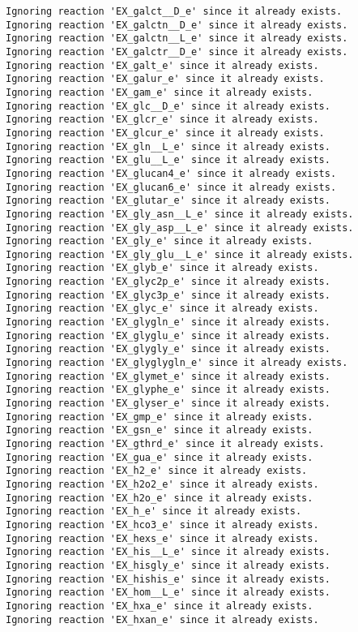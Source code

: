 \documentclass[
  letterpaper,
  DIV=11,
  numbers=noendperiod]{scrartcl}
\begin{document}
\begin{verbatim}
Ignoring reaction 'EX_galct__D_e' since it already exists.
Ignoring reaction 'EX_galctn__D_e' since it already exists.
Ignoring reaction 'EX_galctn__L_e' since it already exists.
Ignoring reaction 'EX_galctr__D_e' since it already exists.
Ignoring reaction 'EX_galt_e' since it already exists.
Ignoring reaction 'EX_galur_e' since it already exists.
Ignoring reaction 'EX_gam_e' since it already exists.
Ignoring reaction 'EX_glc__D_e' since it already exists.
Ignoring reaction 'EX_glcr_e' since it already exists.
Ignoring reaction 'EX_glcur_e' since it already exists.
Ignoring reaction 'EX_gln__L_e' since it already exists.
Ignoring reaction 'EX_glu__L_e' since it already exists.
Ignoring reaction 'EX_glucan4_e' since it already exists.
Ignoring reaction 'EX_glucan6_e' since it already exists.
Ignoring reaction 'EX_glutar_e' since it already exists.
Ignoring reaction 'EX_gly_asn__L_e' since it already exists.
Ignoring reaction 'EX_gly_asp__L_e' since it already exists.
Ignoring reaction 'EX_gly_e' since it already exists.
Ignoring reaction 'EX_gly_glu__L_e' since it already exists.
Ignoring reaction 'EX_glyb_e' since it already exists.
Ignoring reaction 'EX_glyc2p_e' since it already exists.
Ignoring reaction 'EX_glyc3p_e' since it already exists.
Ignoring reaction 'EX_glyc_e' since it already exists.
Ignoring reaction 'EX_glygln_e' since it already exists.
Ignoring reaction 'EX_glyglu_e' since it already exists.
Ignoring reaction 'EX_glygly_e' since it already exists.
Ignoring reaction 'EX_glyglygln_e' since it already exists.
Ignoring reaction 'EX_glymet_e' since it already exists.
Ignoring reaction 'EX_glyphe_e' since it already exists.
Ignoring reaction 'EX_glyser_e' since it already exists.
Ignoring reaction 'EX_gmp_e' since it already exists.
Ignoring reaction 'EX_gsn_e' since it already exists.
Ignoring reaction 'EX_gthrd_e' since it already exists.
Ignoring reaction 'EX_gua_e' since it already exists.
Ignoring reaction 'EX_h2_e' since it already exists.
Ignoring reaction 'EX_h2o2_e' since it already exists.
Ignoring reaction 'EX_h2o_e' since it already exists.
Ignoring reaction 'EX_h_e' since it already exists.
Ignoring reaction 'EX_hco3_e' since it already exists.
Ignoring reaction 'EX_hexs_e' since it already exists.
Ignoring reaction 'EX_his__L_e' since it already exists.
Ignoring reaction 'EX_hisgly_e' since it already exists.
Ignoring reaction 'EX_hishis_e' since it already exists.
Ignoring reaction 'EX_hom__L_e' since it already exists.
Ignoring reaction 'EX_hxa_e' since it already exists.
Ignoring reaction 'EX_hxan_e' since it already exists.

\end{verbatim}
\end{document}
